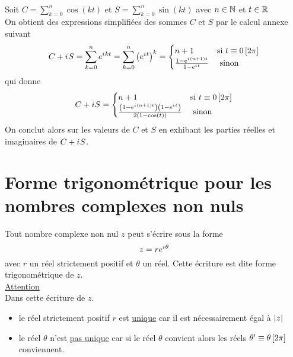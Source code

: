 \begin{appl}
	~\\
	Soit \(C = \sum_{k=0}^n \cos(kt)\) et \(S = \sum_{k=0}^n \sin(kt)\) avec \(n \in \mathbb{N}\) et \(t \in \mathbb{R}\)\\
	On obtient des expressions simplifiées des sommes \(C\) et \(S\) par le calcul annexe suivant
	\[C+i\mkern1mu S = \sum_{k=0}^n e^{i\mkern1mu kt} = \sum_{k=0}^n \left(e^{i\mkern1mu t}\right)^k =
		\begin{cases}
			n+1                               & \text{si } t\equiv 0\left[2 \pi\right] \\
			\frac{1-e^{i\mkern1mu(n+1)t}}{1-e^{i\mkern1mu t}} & \text{ sinon }
		\end{cases}
	\]
	qui donne \[C+i\mkern1mu S = \begin{cases}
			n+1                                                                       & \text{si } t\equiv 0\left[2 \pi\right] \\
			\frac{\left(1-e^{i\mkern1mu(n+1)t}\right)\left(1-e^{i\mkern1mu t}\right)}{2\left(1-\cos\left(t\right)\right)} & \text{ sinon }
		\end{cases} \]
	On conclut alors sur les valeurs de \(C\) et \(S\) en exhibant les parties réelles et imaginaires de \(C + i\mkern1mu S\).
\end{appl}

\section{Forme trigonométrique pour les nombres complexes non nuls}

\begin{defprop}
	Tout nombre complexe non nul \(z\) peut s’écrire sous la forme \[ z = re^{i\mkern1mu \theta}\]
	avec \(r\) un réel strictement positif et \(\theta\) un réel. Cette écriture est dite forme trigonométrique de \(z\). \\
	\underline{Attention} \\
	Dans cette écriture de \(z\).
	\begin{itemize}
		\item le réel strictement positif \(r\) est \underline{unique} car il est nécessairement égal à \(\left\lvert z\right\rvert\)
		\item le réel \(\theta\) n'est \underline{pas unique} car si le réel \(\theta\) convient alors les réels \(\theta ' \equiv \theta \left[2 \pi\right]\) conviennent.
	\end{itemize}
\end{defprop}


